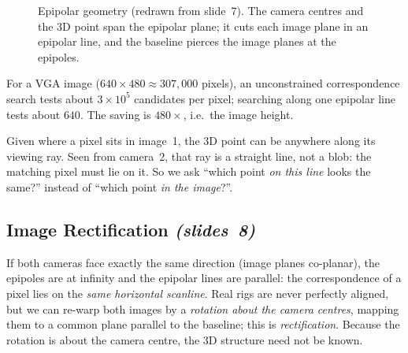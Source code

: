 \documentclass[11pt,a4paper]{article}
\newcommand{\slr}[1]{\texorpdfstring{\emph{(slides~#1)}}{(slides #1)}}
\theoremstyle{definition}
\begin{document}
\begin{figure}[H]\centering
{}
\caption{Epipolar geometry (redrawn from slide~7). The camera centres and the 3D point span the epipolar plane; it cuts each image plane in an epipolar line, and the baseline pierces the image planes at the epipoles.}
\end{figure}

\begin{Example}
For a VGA image ($640\times480\approx 307{,}000$ pixels), an unconstrained correspondence search tests about $3\times10^5$ candidates per pixel; searching along one epipolar line tests about $640$. The saving is $480\times$, i.e.\ the image height.
\end{Example}
\begin{intuition}
Given where a pixel sits in image~1, the 3D point can be anywhere along its viewing ray. Seen from camera~2, that ray is a straight line, not a blob: the matching pixel must lie on it. So we ask ``which point \emph{on this line} looks the same?'' instead of ``which point \emph{in the image}?''.
\end{intuition}

\subsection{Image Rectification \slr{8}}
If both cameras face exactly the same direction (image planes co-planar), the epipoles are at infinity and the epipolar lines are parallel: the correspondence of a pixel lies on the \emph{same horizontal scanline}. Real rigs are never perfectly aligned, but we can re-warp both images by a \emph{rotation about the camera centres}, mapping them to a common plane parallel to the baseline; this is \emph{rectification}. Because the rotation is about the camera centre, the 3D structure need not be known.
\end{document}
